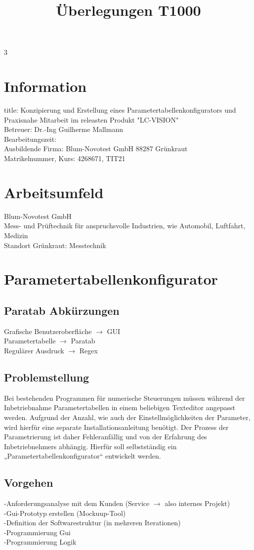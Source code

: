 3\documentclass[12pt,a4paper]{article}
\title{Überlegungen T1000}
\begin{document}
\noindent
\section{Information}
title: Konzipierung und Erstellung eines Parametertabellenkonfigurators und Praxisnahe Mitarbeit im releasten Produkt "LC-VISION"\\
Betreuer: Dr.-Ing Guilherme Mallmann \\
Bearbeitungszeit: \\
Ausbildende Firma: Blum-Novotest GmbH 88287 Grünkraut\\
Matrikelnummer, Kurs: 4268671, TIT21\\
\section{Arbeitsumfeld}
Blum-Novotest GmbH\\
Mess- und Prüftechnik für anspruchsvolle Industrien, wie Automobil, Luftfahrt, Medizin \\
Standort Grünkraut: Messtechnik 
\section{Parametertabellenkonfigurator}
\subsection{Paratab Abkürzungen}
Grafische Benutzeroberfläche $\rightarrow$ GUI\\
Parametertabelle $\rightarrow$ Paratab\\
Regulärer Ausdruck $\rightarrow$ Regex
\subsection{Problemstellung}
Bei bestehenden Programmen für numerische Steuerungen müssen während der Inbetriebnahme Parametertabellen in einem beliebigen Texteditor angepasst werden. Aufgrund der Anzahl, wie auch der Einstellmöglichkeiten der Parameter, wird hierfür eine separate Installationsanleitung benötigt. Der Prozess der Parametrierung ist daher Fehleranfällig und von der Erfahrung des Inbetriebnehmers abhängig. Hierfür soll selbstständig ein „Parametertabellenkonfigurator“ entwickelt werden.
\subsection{Vorgehen}
-Anforderungsanalyse mit dem Kunden (Service $\rightarrow$ also internes Projekt)\\
-Gui-Prototyp erstellen (Mockuup-Tool)\\
-Definition der Softwarestruktur (in mehreren Iterationen)\\
-Programmierung Gui\\
-Programmierung Logik\\
\end{document}
